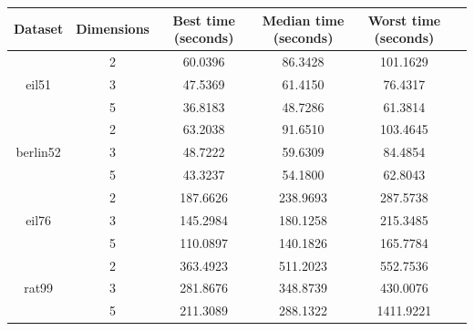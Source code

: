 \documentclass[conference]{IEEEtran}
\begin{document}
\begin{table}[h]
    \centering
    \begin{tabular}{|c|c|c|c|c|c|}
        \hline 
        Dataset & Dimensions & Best time (seconds) & Median time (seconds) & Worst time (seconds) \\
        \hline
        & 2 & 60.0396 & 86.3428 & 101.1629 \\
        eil51 & 3 & 47.5369 & 61.4150 & 76.4317 \\
        & 5 & 36.8183 & 48.7286 & 61.3814 \\
        \hline
        & 2 & 63.2038 & 91.6510 & 103.4645 \\
        berlin52 & 3 & 48.7222 & 59.6309 & 84.4854 \\
        & 5 & 43.3237 & 54.1800 & 62.8043 \\
        \hline
        & 2 & 187.6626 & 238.9693 & 287.5738 \\
        eil76 & 3 & 145.2984 & 180.1258 & 215.3485 \\
        & 5 & 110.0897 & 140.1826 & 165.7784 \\
        \hline
        & 2 & 363.4923 & 511.2023 & 552.7536 \\
        rat99 & 3 & 281.8676 & 348.8739 & 430.0076 \\
        & 5 & 211.3089 & 288.1322 & 1411.9221 \\
        \hline
    \end{tabular}
     \label{Runtime results for the particle swarm optimisation algorithm}
\end{table}
\end{document}
